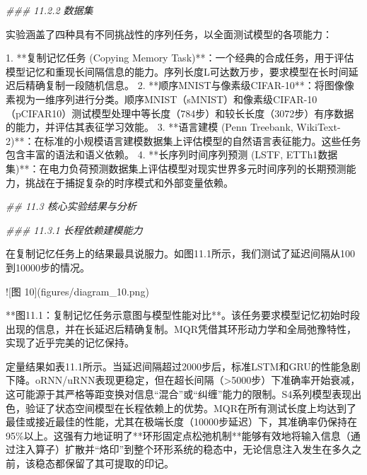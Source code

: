 \documentclass[
  12pt,
]{article}
\newenvironment{Shaded}{}{}
\newcommand{\CommentTok}[1]{\textcolor[rgb]{0.38,0.63,0.69}{\textit{#1}}}
\newcommand{\DecValTok}[1]{\textcolor[rgb]{0.25,0.63,0.44}{#1}}
\newcommand{\FloatTok}[1]{\textcolor[rgb]{0.25,0.63,0.44}{#1}}
\newcommand{\NormalTok}[1]{#1}
\newcommand{\OperatorTok}[1]{\textcolor[rgb]{0.40,0.40,0.40}{#1}}
\begin{document}
\begin{Shaded}
\begin{Highlighting}[]
\CommentTok{\#\#\# 11.2.2 数据集}

\NormalTok{实验涵盖了四种具有不同挑战性的序列任务，以全面测试模型的各项能力：}

\FloatTok{1.}  \OperatorTok{**}\NormalTok{复制记忆任务 (Copying Memory Task)}\OperatorTok{**}\NormalTok{：一个经典的合成任务，用于评估模型记忆和重现长间隔信息的能力。序列长度L可达数万步，要求模型在长时间延迟后精确复制一段随机信息。}
\FloatTok{2.}  \OperatorTok{**}\NormalTok{顺序MNIST与像素级CIFAR}\OperatorTok{{-}}\DecValTok{10}\OperatorTok{**}\NormalTok{：将图像像素视为一维序列进行分类。顺序MNIST（sMNIST）和像素级CIFAR}\OperatorTok{{-}}\DecValTok{10}\NormalTok{（pCIFAR10）测试模型处理中等长度（}\DecValTok{784}\NormalTok{步）和较长长度（}\DecValTok{3072}\NormalTok{步）有序数据的能力，并评估其表征学习效能。}
\FloatTok{3.}  \OperatorTok{**}\NormalTok{语言建模 (Penn Treebank, WikiText}\OperatorTok{{-}}\DecValTok{2}\NormalTok{)}\OperatorTok{**}\NormalTok{：在标准的小规模语言建模数据集上评估模型的自然语言表征能力。这些任务包含丰富的语法和语义依赖。}
\FloatTok{4.}  \OperatorTok{**}\NormalTok{长序列时间序列预测 (LSTF, ETTh1数据集)}\OperatorTok{**}\NormalTok{：在电力负荷预测数据集上评估模型对现实世界多元时间序列的长期预测能力，挑战在于捕捉复杂的时序模式和外部变量依赖。}

\CommentTok{\#\# 11.3 核心实验结果与分析}

\CommentTok{\#\#\# 11.3.1 长程依赖建模能力}

\NormalTok{在复制记忆任务上的结果最具说服力。如图}\FloatTok{11.1}\NormalTok{所示，我们测试了延迟间隔从}\DecValTok{100}\NormalTok{到}\DecValTok{10000}\NormalTok{步的情况。}

\OperatorTok{!}\NormalTok{[图 }\DecValTok{10}\NormalTok{](figures}\OperatorTok{/}\NormalTok{diagram\_10.png)}

\OperatorTok{**}\NormalTok{图}\FloatTok{11.1}\NormalTok{：复制记忆任务示意图与模型性能对比}\OperatorTok{**}\NormalTok{。该任务要求模型记忆初始时段出现的信息，并在长延迟后精确复制。MQR凭借其环形动力学和全局弛豫特性，实现了近乎完美的记忆保持。}

\NormalTok{定量结果如表}\FloatTok{11.1}\NormalTok{所示。当延迟间隔超过}\DecValTok{2000}\NormalTok{步后，标准LSTM和GRU的性能急剧下降。oRNN}\OperatorTok{/}\NormalTok{uRNN表现更稳定，但在超长间隔（}\OperatorTok{\textgreater{}}\DecValTok{5000}\NormalTok{步）下准确率开始衰减，这可能源于其严格等距变换对信息“混合”或“纠缠”能力的限制。S4系列模型表现出色，验证了状态空间模型在长程依赖上的优势。MQR在所有测试长度上均达到了最佳或接近最佳的性能，尤其在极端长度（}\DecValTok{10000}\NormalTok{步延迟）下，其准确率仍保持在}\DecValTok{95}\OperatorTok{\%}\NormalTok{以上。这强有力地证明了}\OperatorTok{**}\NormalTok{环形固定点松弛机制}\OperatorTok{**}\NormalTok{能够有效地将输入信息（通过注入算子）扩散并“烙印”到整个环形系统的稳态中，无论信息注入发生在多久之前，该稳态都保留了其可提取的印记。}


\end{Highlighting}
\end{Shaded}
\end{document}
